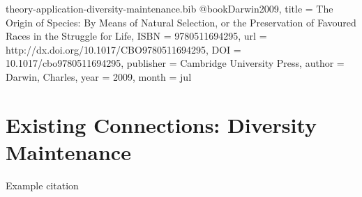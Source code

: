 \begin{bibunit}

\begin{filecontents*}[overwrite]{theory-application-diversity-maintenance.bib}
@book{Darwin2009,
  title = {The Origin of Species: By Means of Natural Selection,  or the Preservation of Favoured Races in the Struggle for Life},
  ISBN = {9780511694295},
  url = {http://dx.doi.org/10.1017/CBO9780511694295},
  DOI = {10.1017/cbo9780511694295},
  publisher = {Cambridge University Press},
  author = {Darwin,  Charles},
  year = {2009},
  month = jul 
}
\end{filecontents*} 

\section{Existing Connections: Diversity Maintenance}
\label{sec:diversity-maintenance}

Example citation \citep{Darwin2009}

    
\end{bibunit}
